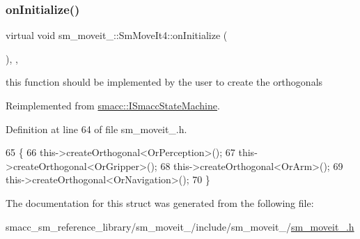 \subsubsection{\texorpdfstring{on\+Initialize()}{onInitialize()}}
{\footnotesize\ttfamily virtual void sm\+\_\+moveit\+\_\+::\+Sm\+Move\+It4\+::on\+Initialize (\begin{DoxyParamCaption}{ }\end{DoxyParamCaption})\hspace{0.3cm}{\ttfamily [inline]}, {\ttfamily [override]}, {\ttfamily [virtual]}}



this function should be implemented by the user to create the orthogonals 



Reimplemented from \hyperlink{classsmacc_1_1ISmaccStateMachine_ac2982c6c8283663e5e1e8a7c82f511ec}{smacc\+::\+I\+Smacc\+State\+Machine}.



Definition at line 64 of file sm\+\_\+moveit\+\_.\+h.


\begin{DoxyCode}
65     \{
66         this->createOrthogonal<OrPerception>();
67         this->createOrthogonal<OrGripper>();
68         this->createOrthogonal<OrArm>();
69         this->createOrthogonal<OrNavigation>();
70     \}
\end{DoxyCode}


The documentation for this struct was generated from the following file\+:\begin{DoxyCompactItemize}
\item 
smacc\+\_\+sm\+\_\+reference\+\_\+library/sm\+\_\+moveit\+\_/include/sm\+\_\+moveit\+\_/\hyperlink{sm__moveit__4_8h}{sm\+\_\+moveit\+\_.\+h}\end{DoxyCompactItemize}

